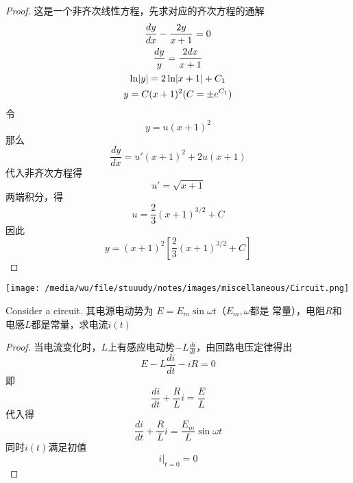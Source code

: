 \documentclass[11pt]{article}
\begin{document}
\begin{proof}
这是一个非齐次线性方程，先求对应的齐次方程的通解
\begin{gather*}
\frac{dy}{dx}-\frac{2y}{x+1}=0\\
\frac{dy}{y}=\frac{2dx}{x+1}\\
\ln\abs{y}=2\ln\abs{x+1}+C_1\\
y=C(x+1)^2(C=\pm e^{C_1})
\end{gather*}
令
\begin{equation*}
y=u(x+1)^2
\end{equation*}
那么
\begin{equation*}
\frac{dy}{dx}=u'(x+1)^2+2u(x+1)
\end{equation*}
代入非齐次方程得
\begin{equation*}
u'=\sqrt{x+1}
\end{equation*}
两端积分，得
\begin{equation*}
u=\frac{2}{3}(x+1)^{3/2}+C
\end{equation*}
因此
\begin{equation*}
y=(x+1)^2[\frac{2}{3}(x+1)^{3/2}+C]
\end{equation*}
\end{proof}



\begin{proposition}[]


\begin{center}
\texttt{[image: /media/wu/file/stuuudy/notes/images/miscellaneous/Circuit.png]}
\end{center}
Consider a circuit. 其电源电动势为 \(E=E_m\sin\omega t\)（\(E_m,\omega\)都是
常量），电阻\(R\)和电感\(L\)都是常量，求电流\(i(t)\)
\end{proposition}

\begin{proof}
当电流变化时，\(L\)上有感应电动势\(-L\frac{di}{dt}\)，由回路电压定律得出
\begin{equation*}
E-L\frac{di}{dt}-iR=0
\end{equation*}
即
\begin{equation*}
\frac{di}{dt}+\frac{R}{L}i=\frac{E}{L}
\end{equation*}
代入得
\begin{equation*}
 \frac{di}{dt}+\frac{R}{L}i=\frac{E_m}{L}\sin\omega t
\end{equation*}
同时\(i(t)\)满足初值
\begin{equation*}
i|_{t=0}=0
\end{equation*}
\end{proof}
\end{document}
